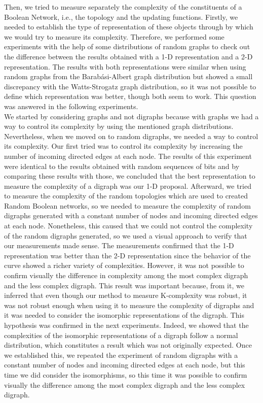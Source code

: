 Then, we tried to measure separately the complexity of the constituents of a Boolean Network, i.e., the topology and the updating functions. Firstly, we needed to establish the type of representation of these objects through by which we would try to measure its complexity. Therefore, we performed some experiments with the help of some distributions of random graphs to check out the difference between the results obtained with a 1-D representation and a 2-D representation. The results with both representations were similar when using random graphs from the Barabási-Albert graph distribution but showed a small discrepancy with the Watts-Strogatz graph distribution, so it was not possible to define which representation was better, though both seem to work. This question was answered in the following experiments.\\

We started by considering graphs and not digraphs because with graphs we had a way to control its complexity by using the mentioned graph distributions. Nevertheless, when we moved on to random digraphs, we needed a way to control its complexity. Our first tried was to control its complexity by increasing the number of incoming directed edges at each node. The results of this experiment were identical to the results obtained with random sequences of bits and by comparing these results with those, we concluded that the best representation to measure the complexity of a digraph was our 1-D proposal. 
Afterward, we tried to measure the complexity of the random topologies which are used to created Random Boolean networks, so we needed to measure the complexity of random digraphs generated with a constant number of nodes and incoming directed edges at each node. Nonetheless, this caused that we could not control the complexity of the random digraphs generated, so we used a visual approach to verify that our measurements made sense. The measurements confirmed that the 1-D representation was better than the 2-D representation since the behavior of the curve showed a richer variety of complexities. However, it was not possible to confirm visually the difference in complexity among the most complex digraph and the less complex digraph. This result was important because, from it, we inferred that even though our method to measure K-complexity was robust, it was not robust enough when using it to measure the complexity of digraphs and it was needed to consider the isomorphic representations of the digraph. This hypothesis was confirmed in the next experiments.
Indeed, we showed that the complexities of the isomorphic representations of a digraph follow a normal distribution, which constitutes a result which was not originally expected. Once we established this, we repeated the experiment of random digraphs with a constant number of nodes and incoming directed edges at each node, but this time we did consider the isomorphisms, so this time it was possible to confirm visually the difference among the most complex digraph and the less complex digraph.\\

